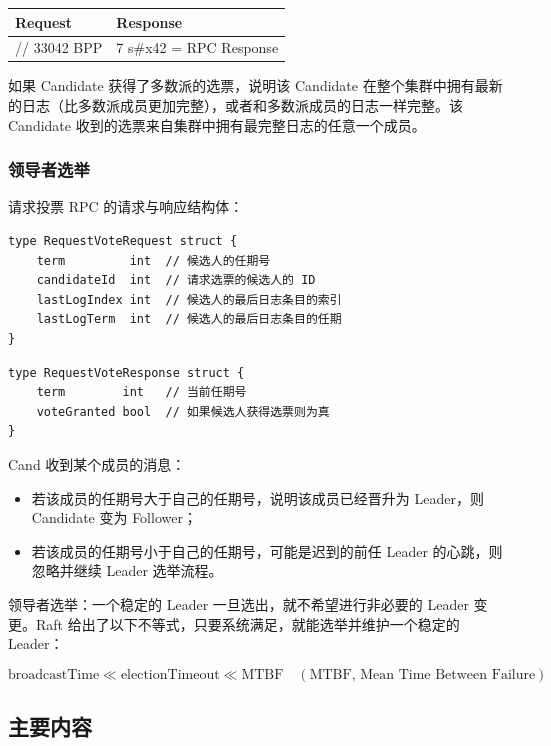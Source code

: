 
\begin{center}
\begin{tabular}{ll}
\toprule
Request & Response \\
\midrule
// 33042 BPP & 7 s\#x42 = RPC Response \\
\bottomrule
\end{tabular}
\end{center}


如果 Candidate 获得了多数派的选票，说明该 Candidate 在整个集群中拥有最新的日志（比多数派成员更加完整），或者和多数派成员的日志一样完整。该 Candidate 收到的选票来自集群中拥有最完整日志的任意一个成员。

\subsubsection{领导者选举}

请求投票 RPC 的请求与响应结构体：

\begin{verbatim}
type RequestVoteRequest struct {
    term         int  // 候选人的任期号
    candidateId  int  // 请求选票的候选人的 ID
    lastLogIndex int  // 候选人的最后日志条目的索引
    lastLogTerm  int  // 候选人的最后日志条目的任期
}
\end{verbatim}

\begin{verbatim}
type RequestVoteResponse struct {
    term        int   // 当前任期号
    voteGranted bool  // 如果候选人获得选票则为真
}
\end{verbatim}

Cand 收到某个成员的消息：
\begin{itemize}
\item 若该成员的任期号大于自己的任期号，说明该成员已经晋升为 Leader，则 Candidate 变为 Follower；
\item 若该成员的任期号小于自己的任期号，可能是迟到的前任 Leader 的心跳，则忽略并继续 Leader 选举流程。
\end{itemize}

领导者选举：一个稳定的 Leader 一旦选出，就不希望进行非必要的 Leader 变更。Raft 给出了以下不等式，只要系统满足，就能选举并维护一个稳定的 Leader：

\[
\text{broadcastTime} \ll \text{electionTimeout} \ll \text{MTBF} \quad (\text{MTBF, Mean Time Between Failure})
\]

\subsection{主要内容}

